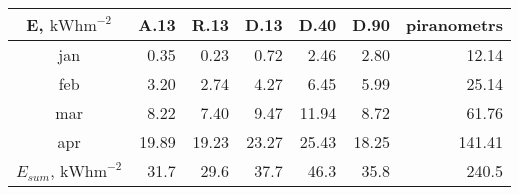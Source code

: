 \begin{tabular}{ | c | r r r r r  r | } \hline
E, $\textrm{kWhm}^{-2}$	&A.13	&R.13	&D.13	&D.40	&D.90	&piranometrs\\ \hline
jan		&0.35	&0.23	&0.72	&2.46	&2.80		&12.14\\
feb		&3.20	&2.74	&4.27	&6.45	&5.99		&25.14\\
mar		&8.22	&7.40	&9.47	&11.94	&8.72		&61.76\\
apr		&19.89	&19.23	&23.27	&25.43	&18.25		&141.41\\ \hline
$E_{sum}$, $\textrm{kWhm}^{-2}$
		&31.7	&29.6	&37.7	&46.3	&35.8 	&240.5\\ \hline
\end{tabular}